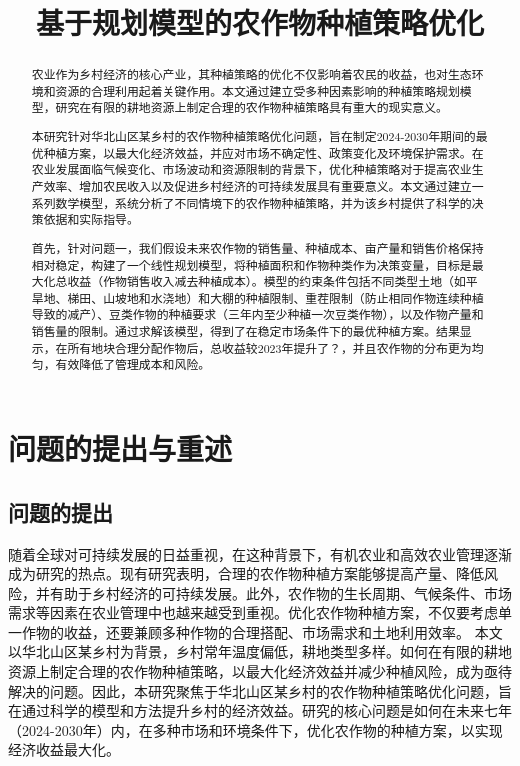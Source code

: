 \documentclass{cumcmthesis}
\title{基于规划模型的农作物种植策略优化}
\begin{document}
\maketitle

\begin{abstract}
农业作为乡村经济的核心产业，其种植策略的优化不仅影响着农民的收益，也对生态环境和资源的合理利用起着关键作用。本文通过建立受多种因素影响的种植策略规划模型，研究在有限的耕地资源上制定合理的农作物种植策略具有重大的现实意义。

本研究针对华北山区某乡村的农作物种植策略优化问题，旨在制定2024-2030年期间的最优种植方案，以最大化经济效益，并应对市场不确定性、政策变化及环境保护需求。在农业发展面临气候变化、市场波动和资源限制的背景下，优化种植策略对于提高农业生产效率、增加农民收入以及促进乡村经济的可持续发展具有重要意义。本文通过建立一系列数学模型，系统分析了不同情境下的农作物种植策略，并为该乡村提供了科学的决策依据和实际指导。

首先，针对问题一，我们假设未来农作物的销售量、种植成本、亩产量和销售价格保持相对稳定，构建了一个线性规划模型，将种植面积和作物种类作为决策变量，目标是最大化总收益（作物销售收入减去种植成本）。模型的约束条件包括不同类型土地（如平旱地、梯田、山坡地和水浇地）和大棚的种植限制、重茬限制（防止相同作物连续种植导致的减产）、豆类作物的种植要求（三年内至少种植一次豆类作物），以及作物产量和销售量的限制。通过求解该模型，得到了在稳定市场条件下的最优种植方案。结果显示，在所有地块合理分配作物后，总收益较2023年提升了？，并且农作物的分布更为均匀，有效降低了管理成本和风险。

\end{abstract}

\section{问题的提出与重述}
\subsection{问题的提出}
随着全球对可持续发展的日益重视，在这种背景下，有机农业和高效农业管理逐渐成为研究的热点。现有研究表明，合理的农作物种植方案能够提高产量、降低风险，并有助于乡村经济的可持续发展\cite{ref1}。此外，农作物的生长周期、气候条件、市场需求等因素在农业管理中也越来越受到重视。优化农作物种植方案，不仅要考虑单一作物的收益，还要兼顾多种作物的合理搭配、市场需求和土地利用效率。
本文以华北山区某乡村为背景，乡村常年温度偏低，耕地类型多样。如何在有限的耕地资源上制定合理的农作物种植策略，以最大化经济效益并减少种植风险，成为亟待解决的问题。因此，本研究聚焦于华北山区某乡村的农作物种植策略优化问题，旨在通过科学的模型和方法提升乡村的经济效益。研究的核心问题是如何在未来七年（2024-2030年）内，在多种市场和环境条件下，优化农作物的种植方案，以实现经济收益最大化。
\end{document}
